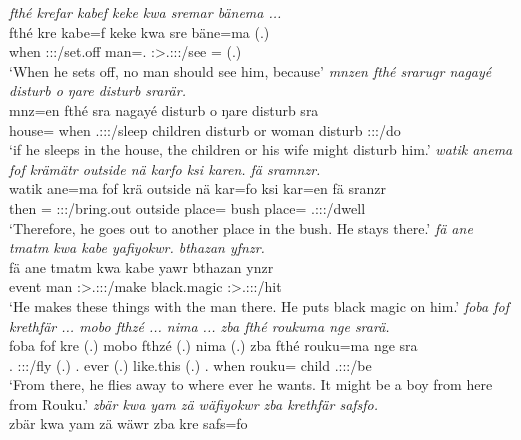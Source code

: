 \begin{exe}
	\emph{fthé krefar kabef keke kwa sremar bänema ...}\\
	\gll fthé kre kabe=f keke kwa sre bäne=ma (.)\\
	when \Stsg:\Sbj:\Irr:\Pfv/set.off man=\Erg.\Sg{} \Neg{} \Fut{} \Stsg:\Sbj>\Tsg.\Masc:\Obj:\Irr:\Pfv/see \Recog=\Char{} (.)\\
	\trans `When he sets off, no man should see him, because'
	\emph{mnzen fthé srarugr nagayé disturb o ŋare disturb srarär.}\\
	\gll mnz=en fthé sra nagayé disturb o ŋare disturb sra\\
	house=\Loc{} when \Tsg.\Masc:\Sbj:\Irr:\Ipfv/sleep children disturb or woman disturb \Stsg:\Sbj:\Nonpast:\Ipfv/do\\
	\trans `if he sleeps in the house, the children or his wife might disturb him.'
	\emph{watik anema fof krämätr outside nä karfo ksi karen. fä sramnzr.}\\
	\gll watik ane=ma fof krä outside nä kar=fo ksi kar=en fä sranzr\\
	then \Dem=\Char{} \Emph{} \Stsg:\Sbj:\Irr:\Pfv/bring.out outside \Indf{} place=\All{} bush place=\All{} \Dist{} \Tsg.\Masc:\Sbj:\Irr:\Ipfv/dwell\\
	\trans `Therefore, he goes out to another place in the bush. He stays there.'
	\emph{fä ane tmatm kwa kabe yafiyokwr. bthazan yfnzr.}\\
	\gll fä ane tmatm kwa kabe yawr bthazan ynzr\\
	\Dist{} \Dem{} event \Fut{} man \Stsg:\Sbj>\Tsg.\Masc:\Obj:\Nonpast:\Ipfv/make black.magic \Stsg:\Sbj>\Tsg.\Masc:\Obj:\Nonpast:\Ipfv/hit\\
	\trans `He makes these things with the man there. He puts black magic on him.'
	\emph{foba fof krethfär ... mobo fthzé ... nima ... zba fthé roukuma nge srarä.}\\
	\gll foba fof kre (.) mobo fthzé (.) nima (.) zba fthé rouku=ma nge sra\\
	\Dist.\Abl{} \Emph{} \Stsg:\Sbj:\Irr:\Ipfv/fly (.) \Med.\All{} ever (.) like.this (.) \Prox.\Abl{} when rouku=\Char{} child \Tsg.\Masc:\Sbj:\Irr:\Ipfv/be\\
	\trans `From there, he flies away to where ever he wants. It might be a boy from here from Rouku.'
	\emph{zbär kwa yam zä wäfiyokwr zba krethfär safsfo.}\\
	\gll zbär kwa yam zä wäwr zba kre safs=fo\\

\end{exe}
